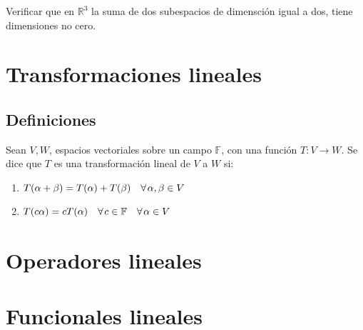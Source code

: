 		\begin{ejercicio}
			Verificar que en $\mathbb{R}^3$ la suma de dos subespacios de dimensción igual a dos, tiene dimensiones no cero.
		\end{ejercicio}


\section{Transformaciones lineales}

	\subsection{Definiciones}

		\begin{definicion}
			Sean $V, W$, espacios vectoriales sobre un campo $\mathbb{F}$, con una función $T \colon V \to W$.
			Se dice que $T$ es una transformación lineal de $V$ a $W$ si:

			\begin{enumerate}
				\item $T(\alpha + \beta) = T(\alpha) + T(\beta) \quad \forall \mkern2mu \alpha, \beta \in V$
				\item $T(c \alpha) = c T(\alpha) \quad \forall \mkern2mu c \in \mathbb{F} \quad \forall \mkern2mu \alpha \in V$
			\end{enumerate}
		\end{definicion}


\section{Operadores lineales}


\section{Funcionales lineales}

